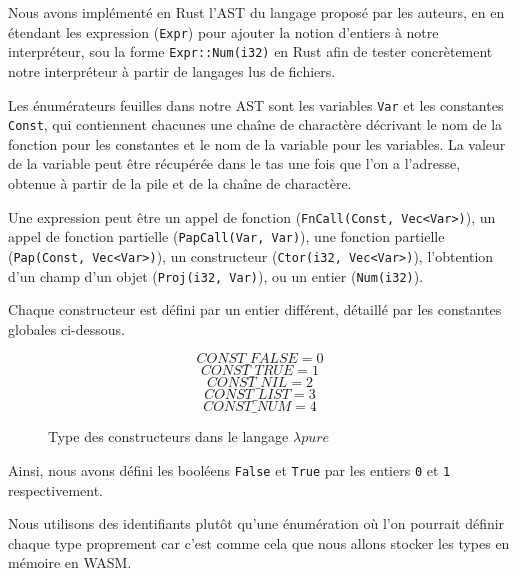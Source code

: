 \documentclass{rapportECL}
\begin{document}
Nous avons implémenté en Rust l'AST du langage proposé par les auteurs, en en étendant les 
expression (\verb|Expr|) pour ajouter la notion d'entiers à notre interpréteur,
sou la forme \verb|Expr::Num(i32)| en Rust afin de tester concrètement notre interpréteur à partir de
langages lus de fichiers.

\bigskip

Les énumérateurs feuilles dans notre AST sont les variables \verb|Var| et les constantes \verb|Const|,
qui contiennent chacunes une chaîne de charactère décrivant le nom de la fonction pour les constantes et 
le nom de la variable pour les variables. La valeur de la variable peut être récupérée dans le tas
une fois que l'on a l'adresse, obtenue à partir de la pile et de la chaîne de charactère.

\medskip

Une expression peut être un appel de fonction (\verb|FnCall(Const, Vec<Var>)|), un appel de fonction partielle (\verb|PapCall(Var, Var)|),
une fonction partielle (\verb|Pap(Const, Vec<Var>)|), un constructeur (\verb|Ctor(i32, Vec<Var>)|), 
l'obtention d'un champ d'un objet (\verb|Proj(i32, Var)|), ou un entier (\verb|Num(i32)|).

\medskip

Chaque constructeur est défini par un entier différent, détaillé par les constantes globales ci-dessous.

\begin{figure}[H]
\begin{equation*}
CONST\_FALSE = 0
\end{equation*}
\begin{equation*}
CONST\_TRUE = 1
\end{equation*}
\begin{equation*}
CONST\_NIL = 2
\end{equation*}
\begin{equation*}
CONST\_LIST = 3
\end{equation*}
\begin{equation*}
CONST\_NUM = 4
\end{equation*}
\caption{Type des constructeurs dans le langage $\lambda{pure}$}
\label{listing:types_ctor}
\end{figure}
\FloatBarrier 
Ainsi, nous avons défini les booléens \verb|False| et \verb|True| par les entiers \verb|0| et \verb|1| respectivement.

Nous utilisons des identifiants plutôt qu'une énumération où l'on pourrait définir chaque type proprement car 
c'est comme cela que nous allons stocker les types en mémoire en WASM.
\end{document}

